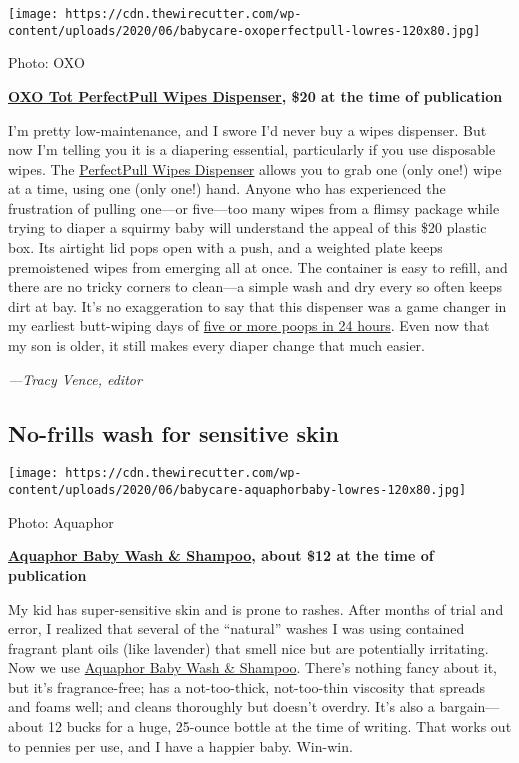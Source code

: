 \texttt{[image: https://cdn.thewirecutter.com/wp-content/uploads/2020/06/babycare-oxoperfectpull-lowres-120x80.jpg]}

Photo: OXO

\textbf{\href{https://www.nytimes3xbfgragh.onion/wirecutter/out/link/39080/162992/4/115960/?merchant=Amazon}{OXO
Tot PerfectPull Wipes Dispenser}, \$20 at the time of publication}

I'm pretty low-maintenance, and I swore I'd never buy a wipes dispenser.
But now I'm telling you it is a diapering essential, particularly if you
use disposable wipes. The
\href{https://www.nytimes3xbfgragh.onion/wirecutter/out/link/39080/162992/4/115960/?merchant=Amazon}{PerfectPull
Wipes Dispenser} allows you to grab one (only one!) wipe at a time,
using one (only one!) hand. Anyone who has experienced the frustration
of pulling one---or five---too many wipes from a flimsy package while
trying to diaper a squirmy baby will understand the appeal of this \$20
plastic box. Its airtight lid pops open with a push, and a weighted
plate keeps premoistened wipes from emerging all at once. The container
is easy to refill, and there are no tricky corners to clean---a simple
wash and dry every so often keeps dirt at bay. It's no exaggeration to
say that this dispenser was a game changer in my earliest butt-wiping
days of
\href{https://parenting.nytimes3xbfgragh.onion/baby/baby-poop}{five or
more poops in 24 hours}. Even now that my son is older, it still makes
every diaper change that much easier.

\emph{---Tracy Vence, editor}

\hypertarget{no-frills-wash-for-sensitive-skin}{%
\subsection{No-frills wash for sensitive
skin}\label{no-frills-wash-for-sensitive-skin}}

\texttt{[image: https://cdn.thewirecutter.com/wp-content/uploads/2020/06/babycare-aquaphorbaby-lowres-120x80.jpg]}

Photo: Aquaphor

\textbf{\href{https://www.nytimes3xbfgragh.onion/wirecutter/out/link/39072/162991/4/115961/?merchant=Amazon}{Aquaphor
Baby Wash \& Shampoo}, about \$12 at the time of publication}

My kid has super-sensitive skin and is prone to rashes. After months of
trial and error, I realized that several of the ``natural'' washes I was
using contained fragrant plant oils (like lavender) that smell nice but
are potentially irritating. Now we use
\href{https://www.nytimes3xbfgragh.onion/wirecutter/out/link/39072/162991/4/115961/?merchant=Amazon}{Aquaphor
Baby Wash \& Shampoo}. There's nothing fancy about it, but it's
fragrance-free; has a not-too-thick, not-too-thin viscosity that spreads
and foams well; and cleans thoroughly but doesn't overdry. It's also a
bargain---about 12 bucks for a huge, 25-ounce bottle at the time of
writing. That works out to pennies per use, and I have a happier baby.
Win-win.

